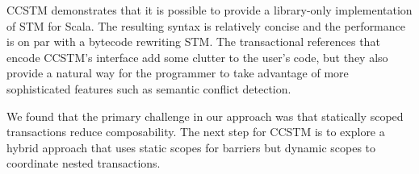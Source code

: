 \color{green}
CCSTM demonstrates that it is possible to provide a library-only
implementation of STM for Scala.  The resulting
syntax is relatively concise and the performance is on par with a bytecode
rewriting STM.  The transactional references that encode CCSTM's interface
add some clutter to the user's code, but they also provide a natural way
for the programmer to take advantage of more sophisticated features such
as semantic conflict detection.

We found that the primary challenge in our approach was that statically
scoped transactions reduce composability.  The next step for CCSTM is
to explore a hybrid approach that uses static scopes for barriers but
dynamic scopes to coordinate nested transactions.
\color{black}
